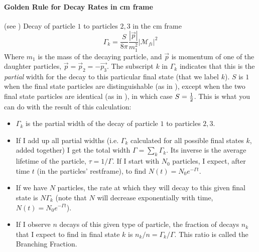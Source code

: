 \paragraph{Golden Rule for Decay Rates in cm frame}
(see )
Decay of particle $1$ to particles $2, 3$ in the cm frame 
\begin{equation}
\Gamma_k = \frac{S}{8\pi} \frac{|\vec{p}|}{m_1^2} \left|\mathcal{M}_{fi}\right|^2
\end{equation}
Where $m_1$ is the mass of the decaying particle, and $\vec{p}$ is momentum of one of the daughter particles, $\vec{p} = \vec{p}_2 = -\vec{p_3}$. The subscript $k$ in $\Gamma_k$ indicates that this is the \emph{partial} width for the decay to this particular final state (that we label $k$). $S$ is $1$ when the final state particles are distinguishable (as in \prt{\pi^+ \to \mu^+ \nu_{\mu}}), except when the two final state particles are identical (as in \prt{\pi^0 \to \gamma \gamma}), in which case $S = \frac{1}{2}$.
This is what you can do with the result of this calculation:
\begin{itemize}
\item $\Gamma_k$ is the partial width of the decay of particle $1$ to particles $2, 3$.
\item If I add up all partial widths (i.e. $\Gamma_k$ calculated for all possible final states $k$, added together) I get the total width $\Gamma = \sum_k \Gamma_k$. Its inverse is the average lifetime of the particle, $\tau = 1/\Gamma$. If I start with $N_0$ particles, I expect, after time $t$ (in the particles' restframe), to find $N(t) = N_0 e^{-\Gamma t}$.
\item If we have $N$ particles, the rate at which they will decay to this given final state is $N\Gamma_k$ (note that $N$ will decrease exponentially with time, $N(t) = N_0 e^{-\Gamma t}$).
\item If I observe $n$ decays of this given type of particle, the fraction of decays $n_k$ that I expect to find in final state $k$ is $n_k/n = \Gamma_k/\Gamma$. This ratio is called the Branching Fraction.
\end{itemize}
